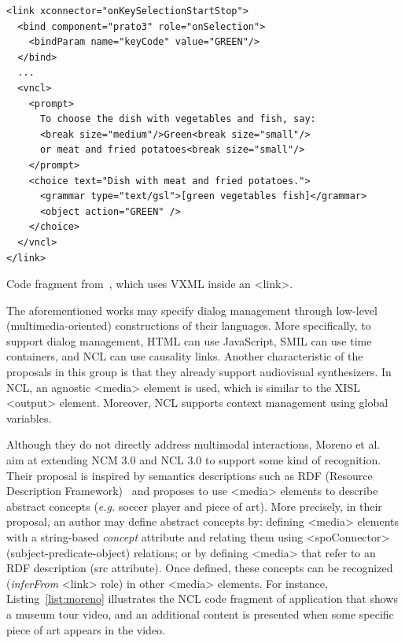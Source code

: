 \documentclass[
  doutorado,
  american
]{ThesisPUC}
\newcommand{\lis}[1]{Listing~\ref{#1}}
\begin{document}
\begin{listing}[!ht]
\begin{verbatim}
<link xconnector="onKeySelectionStartStop">
  <bind component="prato3" role="onSelection">
    <bindParam name="keyCode" value="GREEN"/>
  </bind>
  ...   
  <vncl>
    <prompt>
      To choose the dish with vegetables and fish, say: 
      <break size="medium"/>Green<break size="small"/>
      or meat and fried potatoes<break size="small"/>
    </prompt>
    <choice text="Dish with meat and fried potatoes.">
      <grammar type="text/gsl">[green vegetables fish]</grammar>
      <object action="GREEN" />
    </choice>
  </vncl>
</link>
\end{verbatim}
\caption[NCL using VXML inside an <link>.]{Code fragment 
from~\cite{carvalho_estendendo_2010}, which uses VXML inside an <link>.}
\label{list:carvalho2}
\end{listing}

The aforementioned works may specify dialog management through low-level
(multimedia-oriented) constructions of their languages. More specifically, to
support dialog management, HTML can use JavaScript, SMIL can use time
containers, and NCL can use causality links. Another characteristic of the
proposals in this group is that they already support audiovisual synthesizers.
In NCL, an agnostic <media> element is used, which is similar to the XISL
<output> element. Moreover, NCL supports context management using global
variables.

Although they do not directly address multimodal interactions, Moreno et 
al.~\cite{moreno_extending_2017} aim at extending NCM 3.0 and NCL 3.0 to 
support some kind of recognition.
Their proposal is inspired by semantics descriptions such as RDF (Resource Description Framework)~\cite{w3c_rdf/xml_2014} and proposes to
use <media> elements to describe abstract concepts (\textit{e.g.} soccer player and piece
of art). More precisely, in their proposal, an author may define abstract
concepts by: defining <media> elements with a string-based \textit{concept}
attribute and relating them using <spoConnector> (subject-predicate-object)
relations; or by defining <media> that refer to an RDF description (src
attribute). Once defined, these concepts can be recognized (\textit{inferFrom}
<link> role) in other <media> elements. For instance, \lis{list:moreno} 
illustrates the NCL code fragment of application that shows a museum tour 
video, and an additional content is presented when some specific piece of art 
appears in the video.
\end{document}

